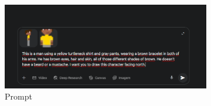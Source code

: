 \begin{figure}[htbp]
    \centering
    \caption{\small Processo da geração 1 do sprite em back view no Gemini Pro em julho/2025}
    \label{fig:geminiProBack1}

    \begin{subfigure}{0.8\linewidth}
        \includegraphics[width=1\linewidth]{figs/geminiPro/chat12/tela01.PNG}
        \caption{\small Prompt}
        \label{fig:geminiProBack1Prompt}
    \end{subfigure}
    \begin{subfigure}{0.3\linewidth}

\end{subfigure}
\end{figure}
